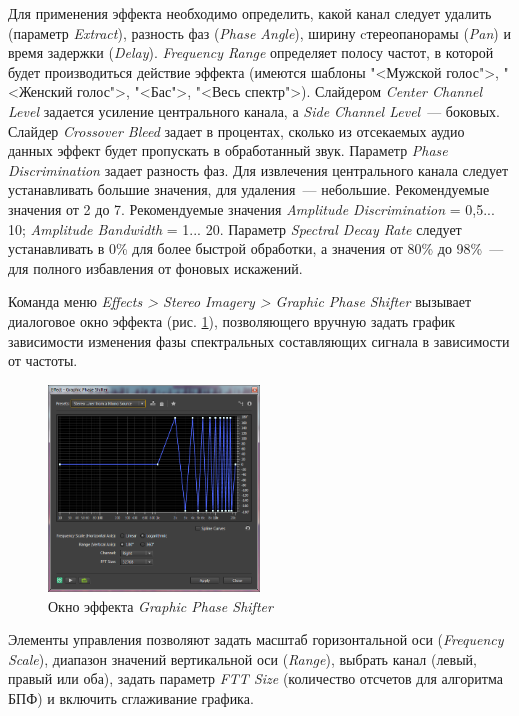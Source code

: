 \documentclass[oneside, final, 14pt]{extreport}
\begin{document}
Для применения эффекта необходимо определить, какой канал следует удалить (параметр \emph{Extract}), разность фаз (\textit{Phase Angle}), ширину cтереопанорамы (\textit{Pan}) и время задержки (\textit{Delay}). \textit{Frequency Range} определяет полосу частот, в которой будет производиться действие эффекта (имеются шаблоны "<Мужской голос">, "<Женский голос">, "<Бас">, "<Весь спектр">). Слайдером \textit{Center Channel Level} задается усиление центрального канала, а \textit{Side Channel Level}~--- боковых. Слайдер \textit{Crossover Bleed} задает в процентах, сколько из отсекаемых аудио данных эффект будет пропускать в обработанный звук. Параметр \textit{Phase Discrimination} задает разность фаз. Для извлечения центрального канала следует устанавливать большие значения, для удаления~--- небольшие. Рекомендуемые значения от 2 до 7. Рекомендуемые значения \textit{Amplitude Discrimination} = 0,5... 10; \textit{Amplitude Bandwidth} = 1... 20. Параметр \textit{Spectral Decay Rate} следует устанавливать в 0\% для более быстрой обработки, а значения от 80\% до 98\%~--- для полного избавления от фоновых искажений.

Команда меню \textit{Effects > Stereo Imagery > Graphic Phase Shifter} вызывает диалоговое окно эффекта (рис. \ref{pic-auphaseshift-01}), позволяющего вручную задать график зависимости изменения фазы спектральных составляющих сигнала в зависимости от частоты.

\begin{figure}[h!]
  \centering
  \includegraphics[width=0.5\textwidth]{pic-auphaseshift-01}
  \caption{Окно эффекта \emph{Graphic Phase Shifter}}
  \label{pic-auphaseshift-01}
\end{figure}

Элементы управления позволяют задать масштаб горизонтальной оси (\emph{Frequency Scale}), диапазон значений вертикальной оси (\emph{Range}), выбрать канал (левый, правый или оба), задать параметр \emph{FTT Size} (количество отсчетов для алгоритма БПФ) и включить сглаживание графика.
\end{document}
